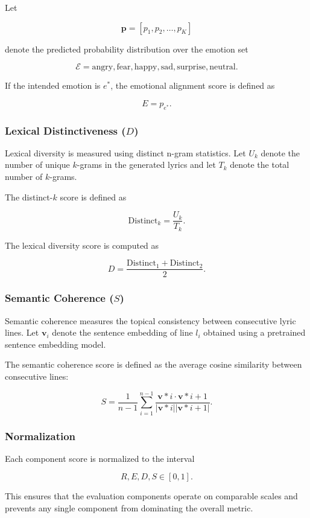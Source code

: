 \documentclass[11pt]{article}
\begin{document}
Let

\[
\mathbf{p} =
[p_1, p_2, \dots, p_K]
\]

denote the predicted probability distribution over the emotion set

\[
\mathcal{E} =
{\text{angry}, \text{fear}, \text{happy}, \text{sad}, \text{surprise}, \text{neutral}}.
\]

If the intended emotion is $e^*$, the emotional alignment score is defined as

\[
E = p_{e^*}.
\]

\subsubsection{Lexical Distinctiveness ($D$)}

Lexical diversity is measured using distinct n-gram statistics. Let $U_k$ denote the number of unique $k$-grams in the generated lyrics and let $T_k$ denote the total number of $k$-grams.

The distinct-$k$ score is defined as

\[
\text{Distinct}_k =
\frac{U_k}{T_k}.
\]

The lexical diversity score is computed as

\[
D =
\frac{\text{Distinct}_1 + \text{Distinct}_2}{2}.
\]

\subsubsection{Semantic Coherence ($S$)}

Semantic coherence measures the topical consistency between consecutive lyric lines. Let $\mathbf{v}_i$ denote the sentence embedding of line $l_i$ obtained using a pretrained sentence embedding model.

The semantic coherence score is defined as the average cosine similarity between consecutive lines:

\[
S =
\frac{1}{n-1}
\sum_{i=1}^{n-1}
\frac{\mathbf{v}*i \cdot \mathbf{v}*{i+1}}
{|\mathbf{v}*i| |\mathbf{v}*{i+1}|}.
\]

\subsubsection{Normalization}

Each component score is normalized to the interval

\[
R, E, D, S \in [0,1].
\]

This ensures that the evaluation components operate on comparable scales and prevents any single component from dominating the overall metric.
\end{document}
